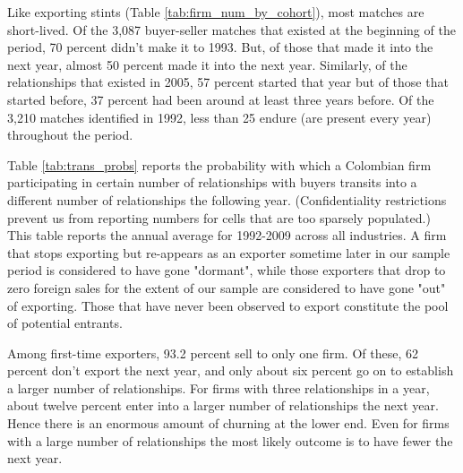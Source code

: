Like exporting stints (Table \ref{tab:firm_num_by_cohort}), most matches are
short-lived. Of the 3,087 buyer-seller matches that existed at the beginning
of the period, 70 percent didn't make it to 1993. But, of those that made it
into the next year, almost 50 percent made it into the next year. Similarly,
of the relationships that existed in 2005, 57 percent started that year but
of those that started before, 37 percent had been around at least three
years before. Of the 3,210 matches identified in 1992, less than 25 endure
(are present every year) throughout the period.

Table \ref{tab:trans_probs} reports the probability with which a Colombian
firm participating in certain number of relationships with buyers transits
into a different number of relationships the following year.
(Confidentiality restrictions prevent us from reporting numbers for cells
that are too sparsely populated.) This table reports the annual average for
1992-2009 across all industries. A firm that stops exporting but re-appears
as an exporter sometime later in our sample period is considered to have
gone "dormant", while those exporters that drop to zero foreign sales for
the extent of our sample are considered to have gone "out" of exporting.
Those that have never been observed to export constitute the pool of
potential entrants.

Among first-time exporters, 93.2 percent sell to only one firm. Of these, 62
percent don't export the next year, and only about six percent go on to
establish a larger number of relationships. For firms with three
relationships in a year, about twelve percent enter into a larger number of
relationships the next year. Hence there is an enormous amount of churning
at the lower end. Even for firms with a large number of relationships the
most likely outcome is to have fewer the next year.

